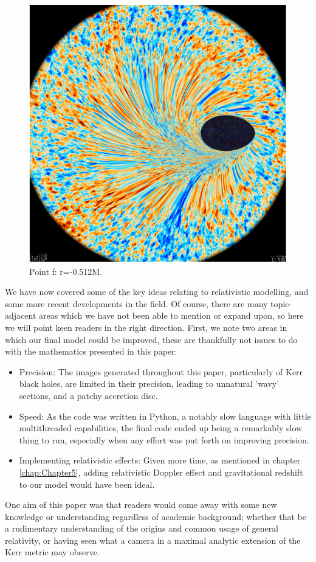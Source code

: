 \documentclass[oneside,openright,frontopenright, singlespacing]{dmathesis}
\begin{document}
\begin{figure}[!ht]
	\centering
	\includegraphics[width=0.4\linewidth]{img/plunging6}
	\caption{Point f: r=-0.512M.}
	\label{fig:Figure6.7}
\end{figure}


\begin{conclusion}
	We have now covered some of the key ideas relating to relativistic modelling, and some more recent developments in the field. Of course, there are many topic-adjacent areas which we have not been able to mention or expand upon, so here we will point keen readers in the right direction. First, we note two areas in which our final model could be improved, these are thankfully not issues to do with the mathematics presented in this paper:

\begin{itemize}
	\item Precision: The images generated throughout this paper, particularly of Kerr black holes, are limited in their precision, leading to unnatural 'wavy' sections, and a patchy accretion disc.
	\item Speed: As the code was written in Python, a notably slow language with little multithreaded capabilities, the final code ended up being a remarkably slow thing to run, especially when any effort was put forth on improving precision.
	\item Implementing relativistic effects: Given more time, as mentioned in chapter \ref{chap:Chapter5}, adding relativistic Doppler effect and gravitational redshift to our model would have been ideal.
\end{itemize}

	One aim of this paper was that readers would come away with some new knowledge or understanding regardless of academic background; whether that be a rudimentary understanding of the origins and common usage of general relativity, or having seen what a camera in a maximal analytic extension of the Kerr metric may observe.


\end{conclusion}
\end{document}
